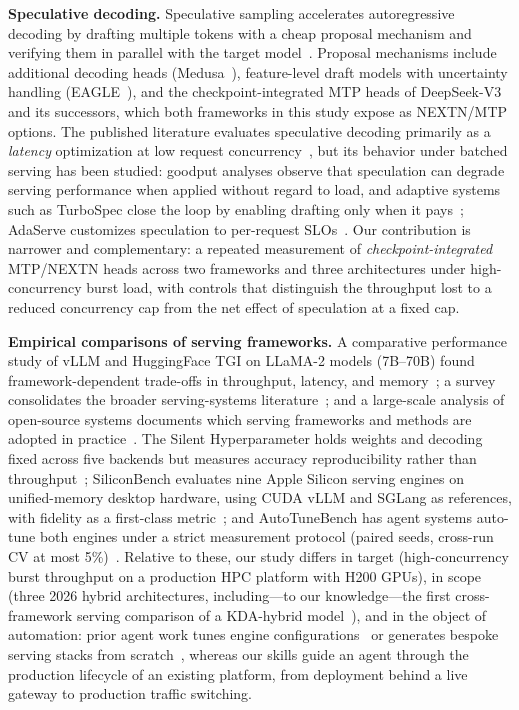 \documentclass[11pt]{article}
\begin{document}
\textbf{Speculative decoding.} Speculative sampling accelerates autoregressive decoding by drafting multiple tokens with a cheap proposal mechanism and verifying them in parallel with the target model~\cite{leviathan2023spec}. Proposal mechanisms include additional decoding heads (Medusa~\cite{cai2024medusa}), feature-level draft models with uncertainty handling (EAGLE~\cite{li2024eagle}), and the checkpoint-integrated MTP heads of DeepSeek-V3~\cite{deepseek2024v3} and its successors, which both frameworks in this study expose as NEXTN/MTP options. The published literature evaluates speculative decoding primarily as a \emph{latency} optimization at low request concurrency~\cite{leviathan2023spec,li2024eagle,cai2024medusa}, but its behavior under batched serving has been studied: goodput analyses observe that speculation can degrade serving performance when applied without regard to load, and adaptive systems such as TurboSpec close the loop by enabling drafting only when it pays~\cite{liu2024turbospec}; AdaServe customizes speculation to per-request SLOs~\cite{li2025adaserve}. Our contribution is narrower and complementary: a repeated measurement of \emph{checkpoint-integrated} MTP/NEXTN heads across two frameworks and three architectures under high-concurrency burst load, with controls that distinguish the throughput lost to a reduced concurrency cap from the net effect of speculation at a fixed cap.

\textbf{Empirical comparisons of serving frameworks.} A comparative performance study of vLLM and HuggingFace TGI on LLaMA-2 models (7B--70B) found framework-dependent trade-offs in throughput, latency, and memory~\cite{kolluru2025tgi}; a survey consolidates the broader serving-systems literature~\cite{li2024survey}; and a large-scale analysis of open-source systems documents which serving frameworks and methods are adopted in practice~\cite{majidi2026wild}. The Silent Hyperparameter holds weights and decoding fixed across five backends but measures accuracy reproducibility rather than throughput~\cite{pape2026silent}; SiliconBench evaluates nine Apple Silicon serving engines on unified-memory desktop hardware, using CUDA vLLM and SGLang as references, with fidelity as a first-class metric~\cite{zhang2026siliconbench}; and AutoTuneBench has agent systems auto-tune both engines under a strict measurement protocol (paired seeds, cross-run CV at most 5\%)~\cite{chen2026autotunebench}. Relative to these, our study differs in target (high-concurrency burst throughput on a production HPC platform with H200 GPUs), in scope (three 2026 hybrid architectures, including---to our knowledge---the first cross-framework serving comparison of a KDA-hybrid model~\cite{kimi2025linear}), and in the object of automation: prior agent work tunes engine configurations~\cite{chen2026autotunebench} or generates bespoke serving stacks from scratch~\cite{kamahori2026vibeserve}, whereas our skills guide an agent through the production lifecycle of an existing platform, from deployment behind a live gateway to production traffic switching.
\end{document}
